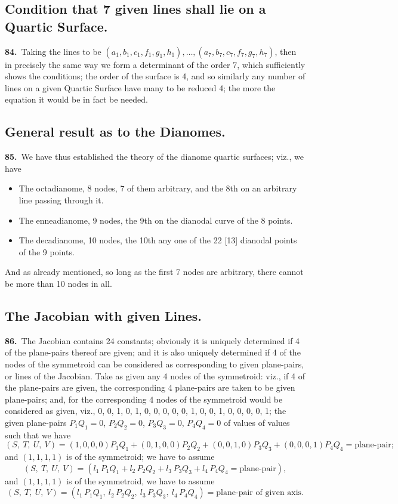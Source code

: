 \documentclass[11pt,a4paper]{article}
\begin{document}
\subsection*{Condition that 7 given lines shall lie on a Quartic Surface.}

\noindent\textbf{84.}\ Taking the lines to be $(a_1, b_1, c_1, f_1, g_1, h_1), \ldots, (a_7, b_7, c_7, f_7, g_7, h_7)$, then in precisely the same way we form a determinant of the order 7, which sufficiently shows the conditions; the order of the surface is 4, and so similarly any number of lines on a given Quartic Surface have many to be reduced 4; the more the equation it would be in fact be needed.

\subsection*{General result as to the Dianomes.}

\noindent\textbf{85.}\ We have thus established the theory of the dianome quartic surfaces; viz., we have
\begin{itemize}
\item The octadianome, 8 nodes, 7 of them arbitrary, and the 8th on an arbitrary line passing through it.
\item The enneadianome, 9 nodes, the 9th on the dianodal curve of the 8 points.
\item The decadianome, 10 nodes, the 10th any one of the 22 [13] dianodal points of the 9 points.
\end{itemize}
And as already mentioned, so long as the first 7 nodes are arbitrary, there cannot be more than 10 nodes in all.

\newpage
\setcounter{page}{167}

\subsection*{The Jacobian with given Lines.}

\noindent\textbf{86.}\ The Jacobian contains 24 constants; obviously it is uniquely determined if 4 of the plane-pairs thereof are given; and it is also uniquely determined if 4 of the nodes of the symmetroid can be considered as corresponding to given plane-pairs, or lines of the Jacobian. Take as given any 4 nodes of the symmetroid: viz., if 4 of the plane-pairs are given, the corresponding 4 plane-pairs are taken to be given plane-pairs; and, for the corresponding 4 nodes of the symmetroid would be considered as given, viz., 0, 0, 1, 0, 1, 0, 0, 0, 0, 0, 1, 0, 0, 1, 0, 0, 0, 0, 1; the given plane-pairs $P_1Q_1 = 0$, $P_2Q_2 = 0$, $P_3Q_3 = 0$, $P_4Q_4 = 0$ of values of values such that we have
\[
(S,\ T,\ U,\ V) = (1, 0, 0, 0)P_1Q_1 + (0, 1, 0, 0)P_2Q_2 + (0, 0, 1, 0)P_3Q_3 + (0, 0, 0, 1)P_4Q_4 = \text{plane-pair};
\]
and $(1, 1, 1, 1)$ is of the symmetroid; we have to assume
\[
(S,\ T,\ U,\ V) = (l_1\,P_1Q_1 + l_2\,P_2Q_2 + l_3\,P_3Q_3 + l_4\,P_4Q_4 = \text{plane-pair}),
\]
and $(1, 1, 1, 1)$ is of the symmetroid, we have to assume
\[
(S,\ T,\ U,\ V) = (l_1\,P_1Q_1,\ l_2\,P_2Q_2,\ l_3\,P_3Q_3,\ l_4\,P_4Q_4) = \text{plane-pair of given axis}.
\]
\end{document}
